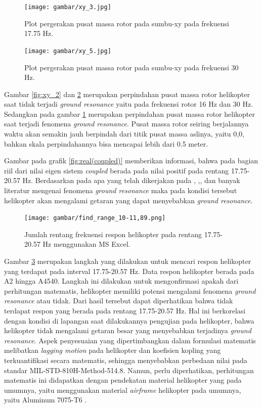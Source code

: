 \begin{figure}[H]
	\centering
	\texttt{[image: gambar/xy\_3.jpg]}
	\caption{Plot pergerakan pusat massa rotor pada sumbu-xy pada frekuensi 17.75 Hz.}
	\label{fig:xy_3}
\end{figure}

\begin{figure}[H]
	\centering
	\texttt{[image: gambar/xy\_5.jpg]}
	\caption{Plot pergerakan pusat massa rotor pada sumbu-xy pada frekuensi 30 Hz.}
	\label{fig:xy_5}
\end{figure}

Gambar \ref{fig:xy_2} dan \ref{fig:xy_5} merupakan perpindahan pusat massa rotor helikopter saat tidak terjadi \textit{ground resonance} yaitu pada frekuensi rotor 16 Hz dan 30 Hz. Sedangkan pada gambar \ref{fig:xy_3} merupakan perpindahan pusat massa rotor helikopter saat terjadi fenomena \textit{ground resonance}. Pusat massa rotor seiring berjalannya waktu akan semakin jauh berpindah dari titik pusat massa aslinya, yaitu 0,0, bahkan skala perpindahannya bisa mencapai lebih dari 0.5 meter. 

Gambar pada grafik \ref{fig:real(coupled)} memberikan informasi, bahwa pada bagian riil dari nilai eigen sistem \textit{coupled} berada pada nilai positif pada rentang 17.75-20.57 Hz. Berdasarkan pada apa yang telah dikerjakan pada \cite{BERGEOT201672}, \cite{Eckert2007AnalyticalAA},\cite{Bergeot_passive}, dan banyak literatur mengenai fenomena \textit{ground resonance} maka pada kondisi tersebut helikopter akan mengalami getaran yang dapat menyebabkan \textit{ground resonance}. 

\begin{figure}[H]
	\centering
	\texttt{[image: gambar/find\_range\_10-11,89.png]}
	\caption{Jumlah rentang frekuensi respon helikopter pada rentang 17.75-20.57 Hz menggunakan MS Excel.}
	\label{fig:resonance_range}
\end{figure}

Gambar \ref{fig:resonance_range} merupakan langkah yang dilakukan untuk mencari respon helikopter yang terdapat pada interval 17.75-20.57 Hz. Data respon helikopter berada pada A2 hingga A4540. Langkah ini dilakukan untuk mengonfirmasi apakah dari perhitungan matematis, helikopter memiliki potensi mengalami fenomena \textit{ground resonance} atau tidak. Dari hasil tersebut dapat diperhatikan bahwa tidak terdapat respon yang berada pada rentang 17.75-20.57 Hz. Hal ini berkorelasi dengan kondisi di lapangan saat dilakukannya pengujian pada helikopter, bahwa helikopter tidak mengalami getaran besar yang menyebabkan terjadinya \textit{ground resonance}. Aspek penyesuaian yang dipertimbangkan dalam formulasi matematis melibatkan \textit{lagging motion} pada helikopter dan koefisien kopling yang terkuantifikasi secara matematis, sehingga menyebabkan perbedaan nilai pada standar MIL-STD-810H-Method-514.8. Namun, perlu diperhatikan, perhitungan matematis ini didapatkan dengan pendekatan material helikopter yang pada umumnya, yaitu menggunakan material \textit{airframe} helikopter pada umumnya, yaitu Aluminum 7075-T6 \cite{ASTM}.

